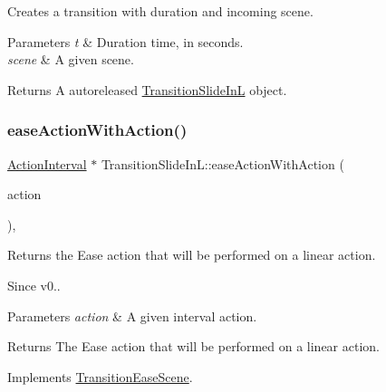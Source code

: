Creates a transition with duration and incoming scene.


\begin{DoxyParams}{Parameters}
{\em t} & Duration time, in seconds. \\
\hline
{\em scene} & A given scene. \\
\hline
\end{DoxyParams}
\begin{DoxyReturn}{Returns}
A autoreleased \hyperlink{classTransitionSlideInL}{Transition\+Slide\+InL} object. 
\end{DoxyReturn}
\mbox{\label{classTransitionSlideInL_a33aad529498bca2822e6e6f12e78ad4c}} 
\subsubsection{\texorpdfstring{ease\+Action\+With\+Action()}{easeActionWithAction()}\hspace{0.1cm}{\footnotesize\ttfamily [1/2]}}
{\footnotesize\ttfamily \hyperlink{classActionInterval}{Action\+Interval} $\ast$ Transition\+Slide\+In\+L\+::ease\+Action\+With\+Action (\begin{DoxyParamCaption}\item[{\hyperlink{classActionInterval}{Action\+Interval} $\ast$}]{action }\end{DoxyParamCaption})\hspace{0.3cm}{\ttfamily [override]}, {\ttfamily [virtual]}}

Returns the Ease action that will be performed on a linear action. \begin{DoxySince}{Since}
v0..
\end{DoxySince}

\begin{DoxyParams}{Parameters}
{\em action} & A given interval action. \\
\hline
\end{DoxyParams}
\begin{DoxyReturn}{Returns}
The Ease action that will be performed on a linear action. 
\end{DoxyReturn}


Implements \hyperlink{classTransitionEaseScene_a6f27540600b0d703ed30adc8976e65df}{Transition\+Ease\+Scene}.

